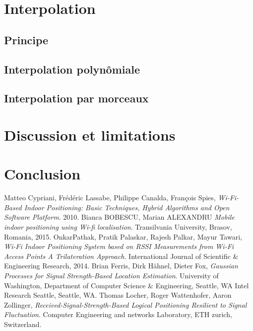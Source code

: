 \documentclass[11pt,journal,compsoc]{IEEEtran}
\begin{document}
\section{Interpolation}
  \subsection{Principe}
  \subsection{Interpolation polynômiale}
  \subsection{Interpolation par morceaux}  %
\section{Discussion et limitations}
\section{Conclusion}

\begin{thebibliography}{9}
    Matteo Cypriani, Frédéric Lassabe, Philippe Canalda, François Spies,
    \emph{Wi-Fi-Based Indoor Positioning: Basic Techniques, Hybrid Algorithms and Open Software Platform}.
    2010.
    Bianca BOBESCU, Marian ALEXANDRU
    \emph{Mobile indoor positioning using Wi-fi localisation}.
    Transilvania University, Brasov, Romania,
    2015.
    OnkarPathak, Pratik Palaskar, Rajesh Palkar, Mayur Tawari,
    \emph{Wi-Fi Indoor Positioning System based on RSSI Measurements from Wi-Fi Access Points A Trilateration Approach}.
    International Journal of Scientific \& Engineering Research,
    2014.
    Brian Ferris, Dirk Hähnel, Dieter Fox,
    \emph{Gaussian Processes for Signal Strength-Based Location Estimation}.
    University of Washington, Department of Computer Science \& Engineering, Seattle, WA Intel Research Seattle, Seattle, WA.
    Thomas Locher, Roger Wattenhofer, Aaron Zollinger,
    \emph{Received-Signal-Strength-Based Logical Positioning Resilient to Signal Fluctuation}.
    Computer Engineering and networks Laboratory, ETH zurich, Switzerland.
\end{thebibliography}
\end{document}
